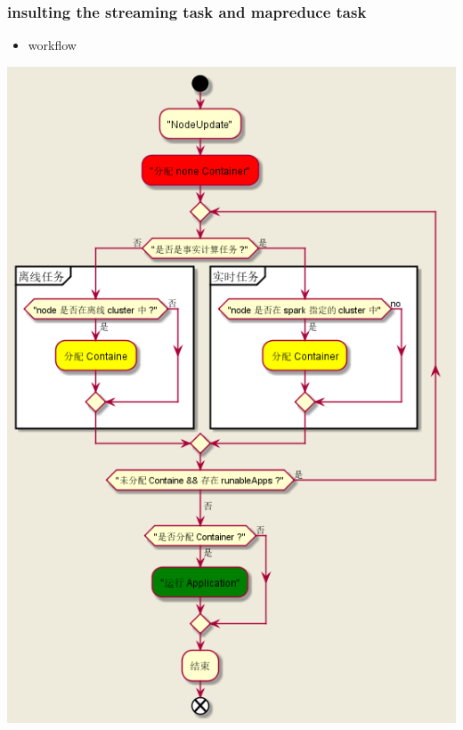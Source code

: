 \documentclass[11pt]{article}
\begin{document}
\subsubsection{insulting the streaming task and mapreduce task}
\label{sec:orgc9329e7}
\begin{itemize}
\item workflow
\end{itemize}
\begin{center}
\includegraphics[width=.9\linewidth]{../images/yarn-insulate-with-streaming-and-mapreduce.png}
\end{center}
\end{document}
